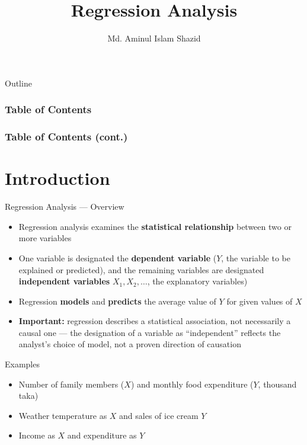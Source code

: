 \documentclass[12pt, aspectratio=169]{beamer}
\title{Regression Analysis}
\author{Md. Aminul Islam Shazid}
\date{}
\begin{document}
    {
        \addtocounter{framenumber}{-2}

        \begin{frame}
            \titlepage
        \end{frame}

        \begin{frame}{Outline}
            \frametitle<1>{Table of Contents}
            \frametitle<2>{Table of Contents (cont.)}
            \vfill
            \vfill
        \end{frame}
    }

    \section{Introduction}

    \begin{frame}{Regression Analysis --- Overview}
        \begin{itemize}
            \item Regression analysis examines the \textbf{statistical relationship} between two or more variables
            \item One variable is designated the \textbf{dependent variable} ($Y$, the variable to be explained or predicted), and the remaining variables are designated \textbf{independent variables} $X_1, X_2, \ldots$, the explanatory variables)
            \item Regression \textbf{models} and \textbf{predicts} the average value of $Y$ for given values of $X$
            \item \textbf{Important:} regression describes a statistical association, not necessarily a causal one --- the designation of a variable as ``independent'' reflects the analyst's choice of model, not a proven direction of causation
        \end{itemize}
    \end{frame}


    \begin{frame}{Examples}
        \begin{itemize}
            \item Number of family members ($X$) and monthly food expenditure ($Y$, thousand taka)
            \item Weather temperature as \(X\) and sales of ice cream \(Y\)
            \item Income as \(X\) and expenditure as \(Y\)
        \end{itemize}
    \end{frame}
\end{document}
